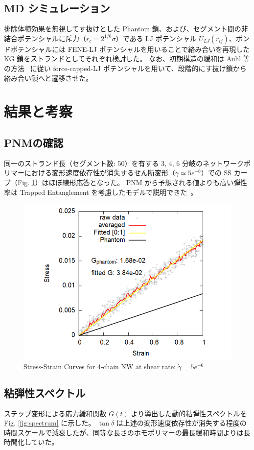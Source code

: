 \documentclass[uplatex,10pt,a4paper,twocolumn]{jsarticle}
\begin{document}
\subsection{MD シミュレーション}
排除体積効果を無視してす抜けとした Phantom 鎖、および、セグメント間の非結合ポテンシャルに斥力（$r_c = 2^{1/6}\sigma$）である LJ ポテンシャル $U_{LJ}(r_{ij})$、ボンドポテンシャルには FENE-LJ ポテンシャルを用いることで絡み合いを再現した KG 鎖をストランドとしてそれぞれ検討した。
なお、初期構造の緩和は Auhl 等の方法~\cite{Auhl} に従い force-capped-LJ ポテンシャルを用いて、段階的にす抜け鎖から絡み合い鎖へと遷移させた。

\section{結果と考察}

\subsection{PNMの確認}
同一のストランド長（セグメント数: 50）を有する 3, 4, 6 分岐のネットワークポリマーにおける変形速度依存性が消失するせん断変形（$\dot{\gamma} \simeq 5e^{-6}$）での SS カーブ（Fig. \ref{fig:shear}）はほぼ線形応答となった。
PNM から予想される値よりも高い弾性率は Trapped Entanglement を考慮したモデルで説明できた~\cite{rubinstein}。
\vspace{-3mm}
\begin{figure}[htb]
\centering
	\includegraphics[width=.47\textwidth]{4chain_N50_shear.png}
	\caption{Stress-Strain Curves for 4-chain NW at shear rate: $\dot{\gamma} = 5e^{-6}$}
	\label{fig:shear}
\end{figure}
\vspace{-5mm}

\subsection{粘弾性スペクトル}
ステップ変形による応力緩和関数 $G(t)$ より導出した動的粘弾性スペクトルを Fig. \ref{fig:spectrum} に示した。
$\tan \delta$ は上述の変形速度依存性が消失する程度の時間スケールで減衰したが、同等な長さのホモポリマーの最長緩和時間よりは長時間化していた。
\end{document}
